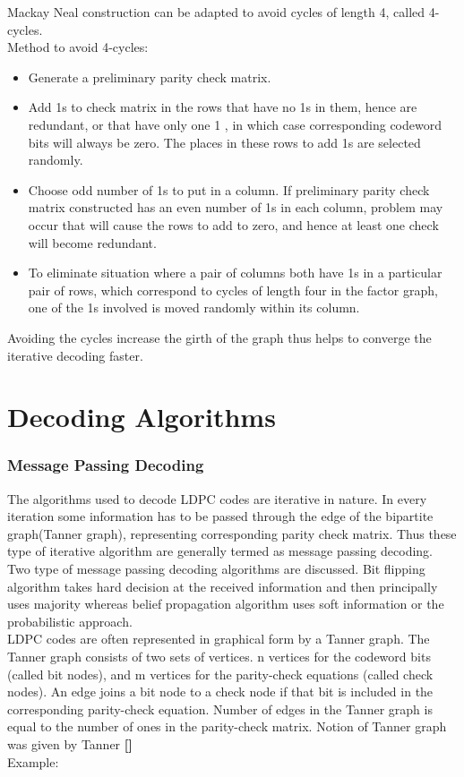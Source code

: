 \documentclass[twopage,12pt,a4paper]{report}
\begin{document}
\begin{raggedright}
\begin{enumerate}
Mackay Neal construction can be adapted to avoid cycles of length 4, called 4-cycles.\\
Method to avoid 4-cycles:
\begin{itemize}
\item Generate a preliminary parity check matrix.
\item Add 1s to check matrix in the rows that have no 1s in them, hence are redundant, or that have only one 1 , in which case corresponding codeword bits will always be zero. The places in these rows to add 1s are selected randomly. 
\item Choose odd number of 1s to put in a column. If preliminary parity check matrix constructed has an even number of 1s in each column, problem may occur that will cause the rows to add to zero, and hence at least one check will become redundant.
\item To eliminate situation where a pair of columns both have 1s in a particular pair of rows, which correspond to cycles of length four in the factor graph, one of the 1s involved is moved randomly within its column.
\end{itemize}
Avoiding the cycles increase the girth of the graph thus helps to converge the iterative decoding faster.  
\end{enumerate} %
\chapter{Decoding Algorithms}
\subsection{Message Passing Decoding}
The algorithms used to decode LDPC codes are iterative in nature. In every iteration some information has to be passed through the edge of the bipartite graph(Tanner graph), representing corresponding parity check matrix. Thus these type of iterative algorithm are generally termed as message passing decoding.\\
Two type of message passing decoding algorithms are discussed. Bit flipping algorithm takes hard decision at the received information and then principally uses majority whereas belief propagation algorithm uses soft information or the probabilistic approach.\\
LDPC codes are often represented in graphical form by a Tanner graph.
The Tanner graph consists of two sets of vertices.
n vertices for the codeword
bits (called bit nodes), and m vertices for the parity-check equations (called
check nodes).
An edge joins a bit node to a check node if that bit is included
in the corresponding parity-check equation. Number of edges in the
Tanner graph is equal to the number of ones in the parity-check matrix. Notion of Tanner graph was given by Tanner \textbf{[]} \\
Example:



\end{raggedright}
\end{document}
